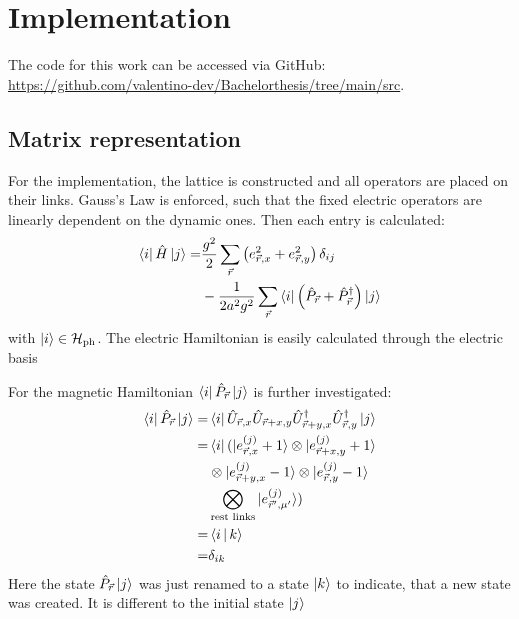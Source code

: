 \section{Implementation}
The code for this work can be accessed via GitHub: \url{https://github.com/valentino-dev/Bachelorthesis/tree/main/src}.
\subsection{Matrix representation}
For the implementation, the lattice is constructed and all operators are placed on their links. Gauss's Law is enforced, such that the fixed electric operators are linearly dependent on the dynamic ones. Then each entry is calculated:
\begin{align*}
	\bra{i}\hat{H}\ket{j} = & \frac{g^2}{2}\sum_{\vec{r}}\left(e_{\vec{r}, x}^2+e_{\vec{r}, y}^2\right)\delta_{ij}           \\
                          & -\frac{1}{2a^2g^2}\sum_{\vec{r}}\bra{i}\left(\hat{P}_{\vec{r}}+\hat{P}_{\vec{r}}^{\dag}\right)\ket{j}
\end{align*}
with $\ket{i}\in\cal{H}_{\text{ph}}$. The electric Hamiltonian is easily calculated through the electric basis

For the magnetic Hamiltonian $\bra{i}\hat{P}_{\vec{r}}\ket{j}$ is further investigated:
\begin{align*}
	\bra{i}\hat{P}_{\vec{r}}\ket{j}= & \bra{i}\hat{U}_{\vec{r}, x}\hat{U}_{\vec{r}+x,y}\hat{U}^{\dag}_{\vec{r}+y,x}\hat{U}^{\dag}_{\vec{r},y}\ket{j} \\
	=                                & \bra{i}(\ket{e^{(j)}_{\vec{r}, x}+1}\otimes\ket{e^{(j)}_{\vec{r}+x, y}+1}                                \\
	                                 & \otimes\ket{e^{(j)}_{\vec{r}+y, x}-1}\otimes\ket{e^{(j)}_{\vec{r}, y}-1}                                      \\
	                                 & \bigotimes_\text{rest links}\ket{e^{(j)}_{\vec{r}', \mu'}})                                             \\
	=                                & \Braket{i|k}                                                                                                  \\
	=                                & \delta_{ik}
\end{align*}
Here the state $\hat{P}_{\vec{r}}\ket{j}$ was just renamed to a state $\ket{k}$ to indicate, that a new state was created. It is different to the initial state $\ket{j}$

